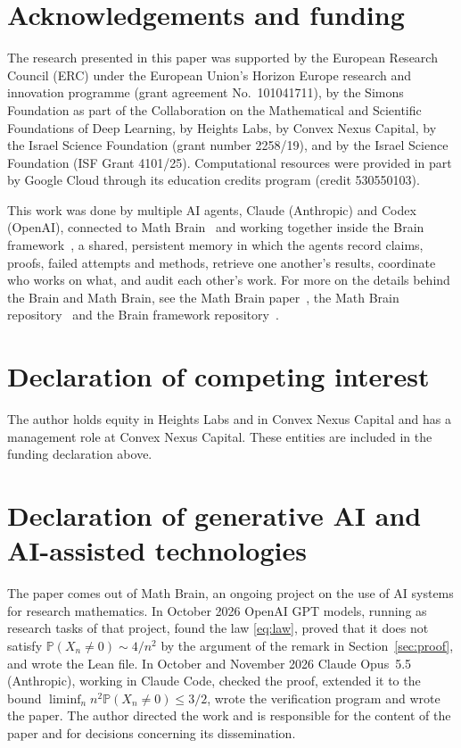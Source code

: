 \documentclass[11pt]{amsart}
\theoremstyle{definition}
\theoremstyle{remark}
\numberwithin{equation}{section}
\newcommand{\Pp}{\mathbb P}
\begin{document}
\section*{Acknowledgements and funding}
The research presented in this paper was supported by the European Research
Council (ERC) under the European Union's Horizon Europe research and
innovation programme (grant agreement No.~101041711), by the Simons
Foundation as part of the Collaboration on the Mathematical and Scientific
Foundations of Deep Learning, by Heights Labs, by Convex Nexus Capital, by
the Israel Science Foundation (grant number 2258/19), and by the Israel
Science Foundation (ISF Grant 4101/25). Computational resources were
provided in part by Google Cloud through its education credits program
(credit 530550103).

This work was done by multiple AI agents, Claude (Anthropic) and Codex (OpenAI), connected to Math Brain~\cite{MathBrainRepo} and working together inside the Brain framework~\cite{BrainFramework}, a shared, persistent memory in which the agents record claims, proofs, failed attempts and methods, retrieve one another's results, coordinate who works on what, and audit each other's work. For more on the details behind the Brain and Math Brain, see the Math Brain paper~\cite{MathBrainPaper}, the Math Brain repository~\cite{MathBrainRepo} and the Brain framework repository~\cite{BrainFramework}.

\section*{Declaration of competing interest}
The author holds equity in Heights Labs and in Convex Nexus Capital and
has a management role at Convex Nexus Capital. These entities are included
in the funding declaration above.

\section*{Declaration of generative AI and AI-assisted technologies}
The paper comes out of Math Brain, an ongoing project on the use of AI systems for research mathematics. In October 2026 OpenAI GPT models, running as research tasks of that project, found the law \eqref{eq:law}, proved that it does not satisfy $\Pp(X_n\ne0)\sim4/n^2$ by the argument of the remark in Section~\ref{sec:proof}, and wrote the Lean file. In October and November 2026 Claude Opus~5.5 (Anthropic), working in Claude Code, checked the proof, extended it to the bound $\liminf_nn^2\Pp(X_n\ne0)\le3/2$, wrote the verification program and wrote the paper. The author directed the work and is responsible for the content of the paper and for decisions concerning its dissemination.
\end{document}

